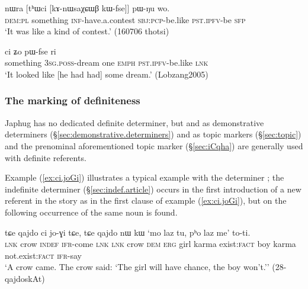  \begin{exe}
\ex \label{ex:thWci.kAnWsaXCWB}
\gll nɯra [tʰɯci [kɤ-nɯsaχɕɯβ kɯ-fse]] pɯ-ŋu wo.  \\
\textsc{dem}:\textsc{pl} something \textsc{inf}-have.a.contest \textsc{sbj}:\textsc{pcp}-be.like \textsc{pst}.\textsc{ipfv}-be \textsc{sfp} \\
\glt `It was like a kind of contest.' (160706 thotsi)
 \end{exe}
 
\begin{exe}
\ex \label{ex:thWci.WjmNo}
 ci ʑo pɯ-fse ri \\
something \textsc{3sg}.\textsc{poss}-dream one \textsc{emph} \textsc{pst}.\textsc{ipfv}-be.like \textsc{lnk} \\
\glt `It looked like [he had had] some dream.' (Lobzang2005)
 \end{exe}
 
 
\subsubsection{The marking of definiteness} \label{sec:definiteness}
Japhug has no dedicated definite determiner, but   and   as demonstrative determiners (§\ref{sec:demonstrative.determiners}) and as topic markers (§\ref{sec:topic}) and the prenominal aforementioned topic marker  (§\ref{sec:iCqha}) are generally used with definite referents.  

Example (\ref{ex:ci.joGi}) illustrates a typical example with the determiner ; the indefinite determiner  (§\ref{sec:indef.article}) occurs in the first introduction of a new referent in the story as in the first clause of example (\ref{ex:ci.joGi}), but on the following occurrence of the same noun  is found.

\begin{exe}
\ex \label{ex:ci.joGi}
 \gll  tɕe qajdo ci jo-ɣi tɕe, tɕe qajdo nɯ kɯ `mo laz tu, pʰo laz me' to-ti. \\
 \textsc{lnk} crow \textsc{indef} \textsc{ifr}-come \textsc{lnk} \textsc{lnk} crow \textsc{dem} \textsc{erg} girl karma exist:\textsc{fact} boy karma not.exist:\textsc{fact} \textsc{ifr}-say \\
 \glt `A crow came. The crow said: `The girl will have  chance, the boy won't.'' (28-qajdoskAt) 
\end{exe}

